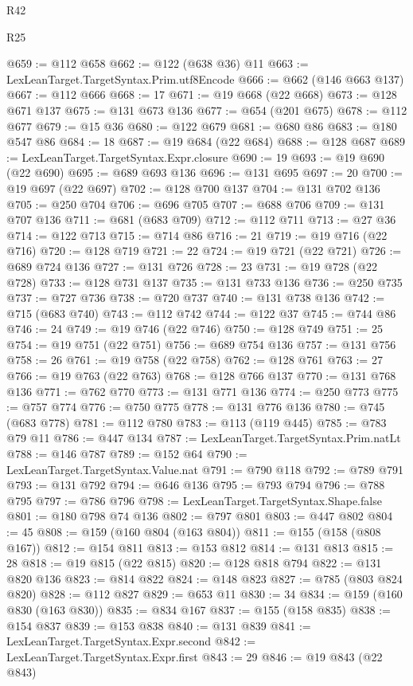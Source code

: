 \begin{lexlean}{R42}
\begin{lexlean}{R25}
\begin{coremodule}
{{{{{{{{{{{{{{{{{{{{{{{{{{{{{{{{{{{{{{{{{{{{{{{{{{{{{{{{{{{{{{{{{{{{{{{{{{{{{{{{{{{{{{{{{{{{{{{{{{{{{{{{{{{{{{{{{{{{{{{{{{{{{{{{{{{{{{{{{{{{{{{{{{{{{{{{{{{{{{{{{{{{{{{{{{{{{{{{{{{{{{{{{{{{{{{{{{{{{{{@659 := @112 @658
@662 := @122 (@638 @36) @11
@663 := LexLeanTarget.TargetSyntax.Prim.utf8Encode
@666 := @662 (@146 @663 @137)
@667 := @112 @666
@668 := 17
@671 := @19 @668 (@22 @668)
@673 := @128 @671 @137
@675 := @131 @673 @136
@677 := @654 (@201 @675)
@678 := @112 @677
@679 := @15 @36
@680 := @122 @679
@681 := @680 @86
@683 := @180 @547 @86
@684 := 18
@687 := @19 @684 (@22 @684)
@688 := @128 @687
@689 := LexLeanTarget.TargetSyntax.Expr.closure
@690 := 19
@693 := @19 @690 (@22 @690)
@695 := @689 @693 @136
@696 := @131 @695
@697 := 20
@700 := @19 @697 (@22 @697)
@702 := @128 @700 @137
@704 := @131 @702 @136
@705 := @250 @704
@706 := @696 @705
@707 := @688 @706
@709 := @131 @707 @136
@711 := @681 (@683 @709)
@712 := @112 @711
@713 := @27 @36
@714 := @122 @713
@715 := @714 @86
@716 := 21
@719 := @19 @716 (@22 @716)
@720 := @128 @719
@721 := 22
@724 := @19 @721 (@22 @721)
@726 := @689 @724 @136
@727 := @131 @726
@728 := 23
@731 := @19 @728 (@22 @728)
@733 := @128 @731 @137
@735 := @131 @733 @136
@736 := @250 @735
@737 := @727 @736
@738 := @720 @737
@740 := @131 @738 @136
@742 := @715 (@683 @740)
@743 := @112 @742
@744 := @122 @37
@745 := @744 @86
@746 := 24
@749 := @19 @746 (@22 @746)
@750 := @128 @749
@751 := 25
@754 := @19 @751 (@22 @751)
@756 := @689 @754 @136
@757 := @131 @756
@758 := 26
@761 := @19 @758 (@22 @758)
@762 := @128 @761
@763 := 27
@766 := @19 @763 (@22 @763)
@768 := @128 @766 @137
@770 := @131 @768 @136
@771 := @762 @770
@773 := @131 @771 @136
@774 := @250 @773
@775 := @757 @774
@776 := @750 @775
@778 := @131 @776 @136
@780 := @745 (@683 @778)
@781 := @112 @780
@783 := @113 (@119 @445)
@785 := @783 @79 @11
@786 := @447 @134
@787 := LexLeanTarget.TargetSyntax.Prim.natLt
@788 := @146 @787
@789 := @152 @64
@790 := LexLeanTarget.TargetSyntax.Value.nat
@791 := @790 @118
@792 := @789 @791
@793 := @131 @792
@794 := @646 @136
@795 := @793 @794
@796 := @788 @795
@797 := @786 @796
@798 := LexLeanTarget.TargetSyntax.Shape.false
@801 := @180 @798 @74 @136
@802 := @797 @801
@803 := @447 @802
@804 := 45
@808 := @159 (@160 @804 (@163 @804))
@811 := @155 (@158 (@808 @167))
@812 := @154 @811
@813 := @153 @812
@814 := @131 @813
@815 := 28
@818 := @19 @815 (@22 @815)
@820 := @128 @818 @794
@822 := @131 @820 @136
@823 := @814 @822
@824 := @148 @823
@827 := @785 (@803 @824 @820)
@828 := @112 @827
@829 := @653 @11
@830 := 34
@834 := @159 (@160 @830 (@163 @830))
@835 := @834 @167
@837 := @155 (@158 @835)
@838 := @154 @837
@839 := @153 @838
@840 := @131 @839
@841 := LexLeanTarget.TargetSyntax.Expr.second
@842 := LexLeanTarget.TargetSyntax.Expr.first
@843 := 29
@846 := @19 @843 (@22 @843)
}}}}}}}}}}}}}}}}}}}}}}}}}}}}}}}}}}}}}}}}}}}}}}}}}}}}}}}}}}}}}}}}}}}}}}}}}}}}}}}}}}}}}}}}}}}}}}}}}}}}}}}}}}}}}}}}}}}}}}}}}}}}}}}}}}}}}}}}}}}}}}}}}}}}}}}}}}}}}}}}}}}}}}}}}}}}}}}}}}}}}}}}}}}}}}}}}}}}}}}
\end{coremodule}
\end{lexlean}
\end{lexlean}
